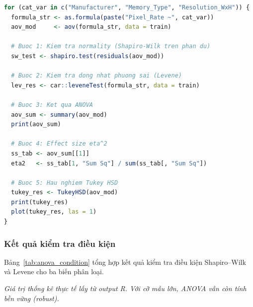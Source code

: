 \begin{lstlisting}[language=R, caption={ANOVA một yếu tố với Tukey HSD và $\eta$²}]
for (cat_var in c("Manufacturer", "Memory_Type", "Resolution_WxH")) {
  formula_str <- as.formula(paste("Pixel_Rate ~", cat_var))
  aov_mod     <- aov(formula_str, data = train)

  # Buoc 1: Kiem tra normality (Shapiro-Wilk tren phan du)
  sw_test <- shapiro.test(residuals(aov_mod))

  # Buoc 2: Kiem tra dong nhat phuong sai (Levene)
  lev_res <- car::leveneTest(formula_str, data = train)

  # Buoc 3: Ket qua ANOVA
  aov_sum <- summary(aov_mod)
  print(aov_sum)

  # Buoc 4: Effect size eta^2
  ss_tab <- aov_sum[[1]]
  eta2   <- ss_tab[1, "Sum Sq"] / sum(ss_tab[, "Sum Sq"])

  # Buoc 5: Hau nghiem Tukey HSD
  tukey_res <- TukeyHSD(aov_mod)
  print(tukey_res)
  plot(tukey_res, las = 1)
}
\end{lstlisting}

\subsubsection{Kết quả kiểm tra điều kiện}

Bảng~\ref{tab:anova_condition} tổng hợp kết quả kiểm tra điều kiện Shapiro--Wilk
và Levene cho ba biến phân loại.

\begin{table}[H]
  \centering
  \caption{Kết quả kiểm tra điều kiện ANOVA}
  \label{tab:anova_condition}
  \par\smallskip
  \footnotesize\textit{Giá trị thống kê thực tế lấy từ output R. Với cỡ mẫu lớn, ANOVA vẫn còn tính bền vững (robust).}
\end{table}

